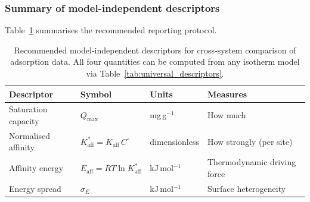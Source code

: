 	\subsubsection{Summary of model-independent descriptors}

	Table~\ref{tab:comparison_protocol} summarises the recommended
	reporting protocol.

	\begin{table}[htbp]
		\centering
		\small
		\caption{Recommended model-independent descriptors for
			cross-system comparison of adsorption data.  All four
			quantities can be computed from any isotherm model via
			Table~\ref{tab:universal_descriptors}.}
		\label{tab:comparison_protocol}
		\renewcommand{\arraystretch}{1.4}
		\begin{tabular}{llll}
			\hline
			\textbf{Descriptor}
			& \textbf{Symbol}
			& \textbf{Units}
			& \textbf{Measures}
			\\
			\hline
			Saturation capacity
			& $Q_{\max}$
			& mg\,g$^{-1}$
			& How much
			\\
			Normalised affinity
			& $K_{\mathrm{aff}}^{\ast}
			= K_{\mathrm{aff}}\,C^\circ$
			& dimensionless
			& How strongly (per site)
			\\
			Affinity energy
			& $E_{\mathrm{aff}}
			= RT\ln K_{\mathrm{aff}}^{\ast}$
			& kJ\,mol$^{-1}$
			& Thermodynamic driving force
			\\
			Energy spread
			& $\sigma_E$
			& kJ\,mol$^{-1}$
			& Surface heterogeneity
			\\
			\hline
		\end{tabular}
	\end{table}

	\noindent{}

